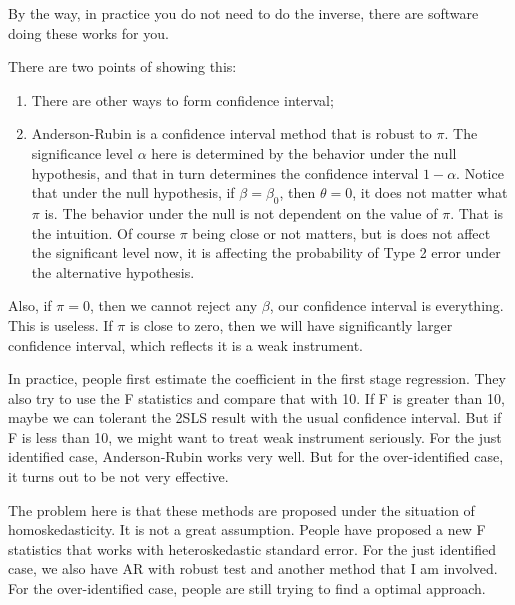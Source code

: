 \documentclass[11pt,a4paper]{amsart}
\theoremstyle{plain}
\theoremstyle{definition}
\begin{document}
	By the way, in practice you do not need to do the inverse, there are software doing these works for you.\par  
	There are two points of showing this:\par 
	\begin{enumerate}
		\item There are other ways to form confidence interval;
		\item Anderson-Rubin is a confidence interval method that is robust to $\pi$. The significance level $\alpha$ here is determined by the behavior under the null hypothesis, and that in turn determines the confidence interval $1-\alpha$. Notice that under the null hypothesis, if $\beta = \beta_{0}$, then $\theta = 0$, it does not matter what $\pi$ is. The behavior under the null is not dependent on the value of $\pi$. That is the intuition. Of course $\pi$ being close or not matters, but is does not affect the significant level now, it is affecting the probability of Type 2 error under the alternative hypothesis.
	\end{enumerate}
	Also, if $\pi = 0$, then we cannot reject any $\beta$, our confidence interval is everything. This is useless. If $\pi$ is close to zero, then we will have significantly larger confidence interval, which reflects it is a weak instrument. \par 
	In practice, people first estimate the coefficient in the first stage regression. They also try to use the F statistics and compare that with 10. If F is greater than 10, maybe  we can tolerant the 2SLS result with the usual confidence interval. But if F is less than 10, we might want to treat weak instrument seriously. For the just identified case, Anderson-Rubin works very well. But for the over-identified case, it turns out to be not very effective. \par 
	The problem here is that these methods are proposed under the situation of homoskedasticity. It is not a great assumption. People have proposed a new F statistics that works with heteroskedastic standard error. For the just identified case, we also have AR with robust test and another method that I am involved. For the over-identified case, people are still trying to find a optimal approach.
\end{document}
